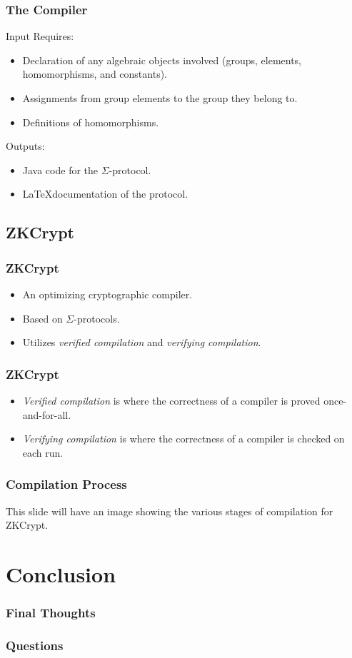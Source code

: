 \documentclass{beamer}
\begin{document}
\begin{frame}
	\frametitle{The Compiler}
	Input Requires:
	\begin{itemize}
		\item Declaration of any algebraic objects involved (groups, elements,
		homomorphisms, and constants).
		\item Assignments from group elements to the group they belong to.
		\item Definitions of homomorphisms.
	\end{itemize}
	Outputs:
	\begin{itemize}
		\item Java code for the $\Sigma$-protocol.
		\item \LaTeX documentation of the protocol.
	\end{itemize}
\end{frame}

\subsection{ZKCrypt}

\begin{frame}
	\frametitle{ZKCrypt}
	\begin{itemize}
		\item An optimizing cryptographic compiler.
		\item Based on $\Sigma$-protocols.
		\item Utilizes \textit{verified compilation} and \textit{verifying compilation}.
	\end{itemize}
\end{frame}

\begin{frame}
	\frametitle{ZKCrypt}
	\begin{itemize}
		\item \textit{Verified compilation} is where the correctness of a compiler is proved 
		once-and-for-all.
		\item \textit{Verifying compilation} is where the correctness of a compiler is checked on
		each run.
	\end{itemize}
\end{frame}

\begin{frame}
	\frametitle{Compilation Process}
	This slide will have an image showing the various stages of compilation for ZKCrypt.
\end{frame}

\begin{comment}
\subsection{ZKPDL}

\begin{frame}
	\frametitle{ZKPDL}
\end{frame}

\end{comment}

\section{Conclusion}

\begin{frame}
	\frametitle{Final Thoughts}
\end{frame}

\begin{frame}
	\frametitle{Questions}
\end{frame}
\end{document}

